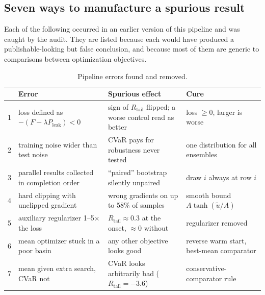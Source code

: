 \documentclass[aps,pra,onecolumn,notitlepage,superscriptaddress,nofootinbib,floatfix]{revtex4-2}
\newcommand{\Rt}{R_{\mathrm{tail}}}
\begin{document}
\subsection{Seven ways to manufacture a spurious result}
\label{sec:pitfalls}

Each of the following occurred in an earlier version of this pipeline and was
caught by the audit. They are listed because each would have produced a
publishable-looking but false conclusion, and because most of them are
generic to comparisons between optimization objectives.

\begin{table}[htbp]
\centering\small
\begin{tabular}{@{}p{}p{}p{}p{}@{}}
\toprule
& Error & Spurious effect & Cure\\
\midrule
1 & loss defined as $-(F-\lambda P_{\mathrm{leak}})<0$ & sign of $\Rt$ flipped; a worse control read as better & loss $\ge0$, larger is worse\\
2 & training noise wider than test noise & CVaR pays for robustness never tested & one distribution for all ensembles\\
3 & parallel results collected in completion order & ``paired'' bootstrap silently unpaired & draw $i$ always at row $i$\\
4 & hard clipping with unclipped gradient & wrong gradients on up to 58\% of samples & smooth bound $A\tanh(\tilde u/A)$\\
5 & auxiliary regularizer 1--5$\times$ the loss & $\Rt\approx0.3$ at the onset, $\approx0$ without & regularizer removed\\
6 & mean optimizer stuck in a poor basin & any other objective looks good & reverse warm start, best-mean comparator\\
7 & mean given extra search, CVaR not & CVaR looks arbitrarily bad ($\Rt=-3.6$) & conservative-comparator rule\\
\bottomrule
\end{tabular}
\caption{Pipeline errors found and removed.}
\label{tab:pitfalls}
\end{table}
\end{document}
